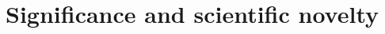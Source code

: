 \documentclass[11pt,a4paper]{article}
\newcommand{\instruction}[1]{}
\begin{document}












\section{Significance and scientific novelty}\instruction{Describe briefly how the project relates to previous research within the area, and its importance in the short and long term. Describe also how the project moves forward or innovates the current research frontier.}
\end{document}
